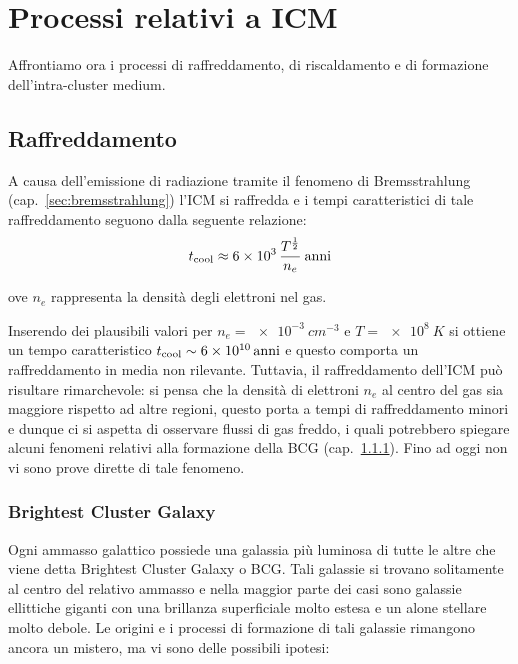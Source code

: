 \section{Processi relativi a ICM}
Affrontiamo ora i processi di raffreddamento, di riscaldamento e di formazione dell’intra-cluster medium.

\subsection{Raffreddamento}
A causa dell’emissione di radiazione tramite il fenomeno di Bremsstrahlung (cap.~\ref{sec:bremsstrahlung}) l’ICM si raffredda e i tempi caratteristici di tale raffreddamento seguono dalla seguente relazione:
\begin{equation}
    t_\textup{cool} \approx \num{6e3}\,\frac{T^{\frac{1}{2}}}{n_e}\:\si{anni}
\end{equation}

\begin{description}
    \item ove $n_e$ rappresenta la densità degli elettroni nel gas.
\end{description} 

Inserendo dei plausibili valori per $n_e = \SI{e-3}{cm^{-3}}$ e $T = \SI{e8}{K}$ si ottiene un tempo caratteristico $t_\textup{cool}\sim\SI{6e10}{anni}$ e questo comporta un raffreddamento in media non rilevante.
Tuttavia, il raffreddamento dell'ICM può risultare rimarchevole: si pensa che la densità di elettroni $n_e$ al centro del gas sia maggiore rispetto ad altre regioni, questo porta a tempi di raffreddamento minori e dunque ci si aspetta di osservare flussi di gas freddo, i quali potrebbero spiegare alcuni fenomeni relativi alla formazione della BCG (cap.~\ref{sec:brightest-cluster-galaxy}). Fino ad oggi non vi sono prove dirette di tale fenomeno.

\subsubsection{Brightest Cluster Galaxy}\label{sec:brightest-cluster-galaxy}
Ogni ammasso galattico possiede una galassia più luminosa di tutte le altre che viene detta Brightest Cluster Galaxy o BCG.
Tali galassie si trovano solitamente al centro del relativo ammasso e nella maggior parte dei casi sono galassie ellittiche giganti con una brillanza superficiale molto estesa e un alone stellare molto debole.
Le origini e i processi di formazione di tali galassie rimangono ancora un mistero, ma vi sono delle possibili ipotesi:

